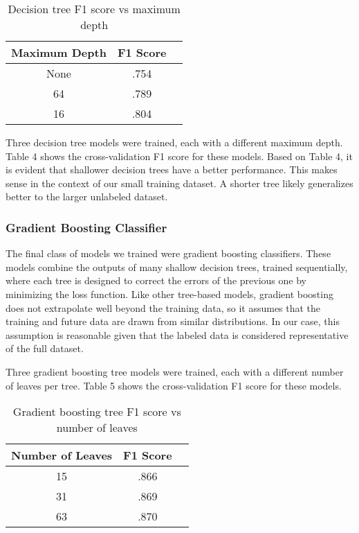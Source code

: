 \documentclass[11pt,letterpaper]{article}
\begin{document}
\begin{center}
\begin{table}[H]
\centering
\caption{Decision tree F1 score vs maximum depth}
\renewcommand{\arraystretch}{1.25}
\begin{tabular}{|c|c|c|}
\hline
Maximum Depth &  F1 Score \\ \hline
None & .754 \\ \hline
64 & .789 \\ \hline
16 & .804 \\ \hline
\end{tabular}
\end{table}
\end{center}

Three decision tree models were trained, each with a different maximum depth. Table 4 shows the cross-validation F1 score for these models. Based on Table 4, it is evident that shallower decision trees have a better performance. This makes sense in the context of our small training dataset. A shorter tree likely generalizes better to the larger unlabeled dataset. 

\subsubsection{Gradient Boosting Classifier}
The final class of models we trained were gradient boosting classifiers. These models combine the outputs of many shallow decision trees, trained sequentially, where each tree is designed to correct the errors of the previous one by minimizing the loss function. Like other tree-based models, gradient boosting does not extrapolate well beyond the training data, so it assumes that the training and future data are drawn from similar distributions. In our case, this assumption is reasonable given that the labeled data is considered representative of the full dataset.

Three gradient boosting tree models were trained, each with a different number of leaves per tree. Table 5 shows the cross-validation F1 score for these models.

\begin{center}
\begin{table}[H]
\centering
\caption{Gradient boosting tree F1 score vs number of leaves}
\renewcommand{\arraystretch}{1.25}
\begin{tabular}{|c|c|c|}
\hline
Number of Leaves &  F1 Score \\ \hline
15 & .866 \\ \hline
31 & .869 \\ \hline
63 & .870 \\ \hline
\end{tabular}
\end{table}
\end{center}
\end{document}
